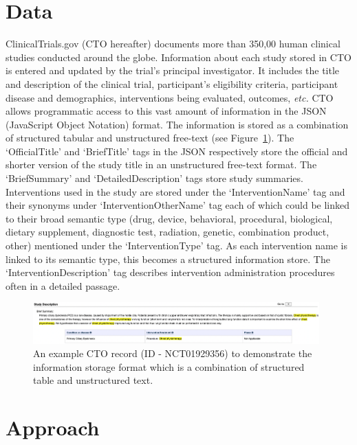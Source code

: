 \documentclass[11pt]{article}
\begin{document}
\section{Data}
\label{sec:data}
%
ClinicalTrials.gov (CTO hereafter) documents more than 350,00 human clinical studies conducted around the globe.
Information about each study stored in CTO is entered and updated by the trial's principal investigator.
It includes the title and description of the clinical trial, participant's eligibility criteria, participant disease and demographics, interventions being evaluated, outcomes, \textit{etc.}
CTO allows programmatic access to this vast amount of information in the JSON (JavaScript Object Notation) format.
The information is stored as a combination of structured tabular and unstructured free-text (see Figure~\ref{fig:CTO_example}).
The `OfficialTitle' and `BriefTitle' tags in the JSON respectively store the official and shorter version of the study title in an unstructured free-text format.
The `BriefSummary' and `DetailedDescription' tags store study summaries.
Interventions used in the study are stored under the `InterventionName' tag and their synonyms under `InterventionOtherName' tag each of which could be linked to their broad semantic type (drug, device, behavioral, procedural, biological, dietary supplement, diagnostic test, radiation, genetic, combination product, other) mentioned under the `InterventionType' tag.
As each intervention name is linked to its semantic type, this becomes a structured information store.
The `InterventionDescription' tag describes intervention administration procedures often in a detailed passage.
%
\begin{figure}[t]
\centering
\includegraphics[width=0.98\textwidth]{figures/figure1.png}
\caption{An example CTO record (ID - NCT01929356) to demonstrate the information storage format which is a combination of structured table and unstructured text.}
\label{fig:CTO_example}
\end{figure}
%
%
%
%
\section{Approach}
\label{sec:methods}
%
%
\end{document}
